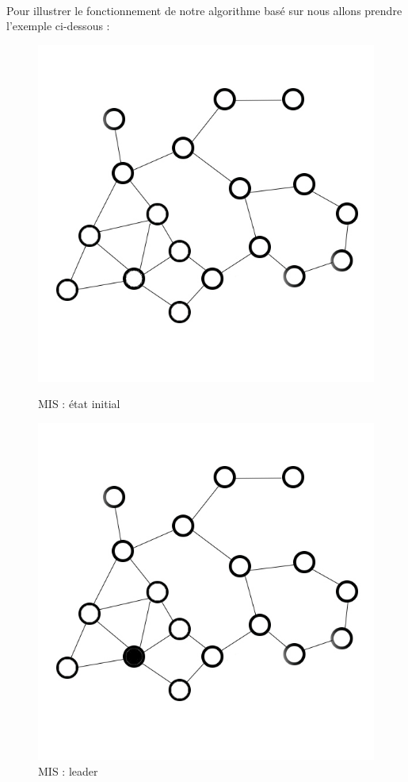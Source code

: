 \paragraph{}
Pour illustrer le fonctionnement de notre algorithme basé sur \cite{cardei2002connected} nous allons prendre l'exemple ci-dessous :
\begin{figure}
   	\begin{minipage}[c]{.46\linewidth}
      	\includegraphics{images/mis1.jpg}
      	\caption{MIS : état initial}
      	\label{mis1}
   	\end{minipage} \hfill
   	\begin{minipage}[c]{.46\linewidth}
      	\includegraphics{images/mis2.jpg}
		\caption{MIS : leader}
		\label{mis2}
   	\end{minipage}
\end{figure}

